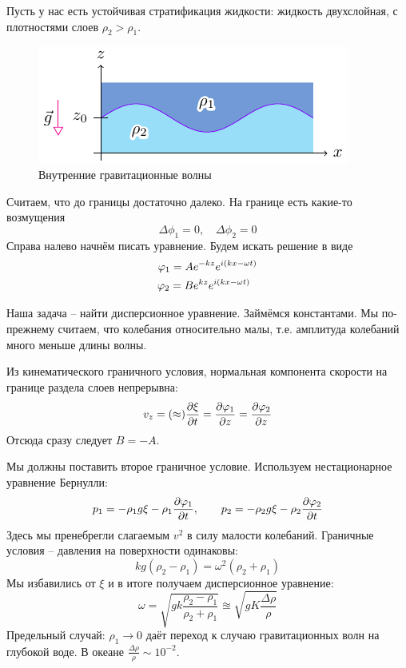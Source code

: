 Пусть у нас есть устойчивая стратификация жидкости: жидкость двухслойная, с плотностями слоев $\rho_2>\rho_1$.
\begin{figure}[H]
    \centering
    \includegraphics[scale=1.5]{img/vnutr}
    \caption{Внутренние гравитационные волны}
    \label{fig:vnutr}
\end{figure}
Считаем, что до границы достаточно далеко.
На границе есть какие-то возмущения
\begin{equation}
    \Delta\phi_1 = 0, \quad \Delta\phi_2 = 0
\end{equation}
Справа налево начнём писать уравнение.
Будем искать решение в виде
\begin{gather}
    \phi_1 = A e^{-kz} e^{i(kx-\omega t)}\\
    \phi_2 = B e^{kz} e^{i(kx-\omega t)}\hphantom{^{-}}
\end{gather}

Наша задача -- найти дисперсионное уравнение. Займёмся константами. Мы по-прежнему считаем, что колебания относительно малы,
т.е. амплитуда колебаний много меньше длины волны.

Из кинематического граничного условия, нормальная компонента скорости на границе раздела слоев непрерывна:
\begin{equation}
    v_z = (\approx) \pdv{\xi}{t} = \pdv{\varphi_1}{z} = \pdv{\varphi_2}{z}
\end{equation}
Отсюда сразу следует $B = -A$.

Мы должны поставить второе граничное условие. Используем нестационарное уравнение Бернулли:
\begin{equation}
    p_1 = -\rho_1 g \xi - \rho_1 \pdv{\varphi_1}{t}, \qquad
    p_2 = -\rho_2 g \xi - \rho_2 \pdv{\varphi_2}{t}
\end{equation}
Здесь мы пренебрегли слагаемым $v^2$ в силу малости колебаний.
Граничные условия -- давления на поверхности одинаковы:
\begin{equation}
    kg(\rho_2-\rho_1) = \omega^2(\rho_2+\rho_1)
\end{equation}
Мы избавились от $\xi$ и в итоге получаем дисперсионное уравнение:
\begin{equation}
    \omega = \sqrt{gk\frac{\rho_2-\rho_1}{\rho_2+\rho_1}} \approxeq \sqrt{gK\frac{\Delta \rho}{\rho}}
\end{equation}
Предельный случай: $\rho_1 \to 0$ даёт переход к случаю гравитационных волн на глубокой воде. 
В океане $ \frac{\Delta\rho}{\rho}\sim 10^{-2}$.

